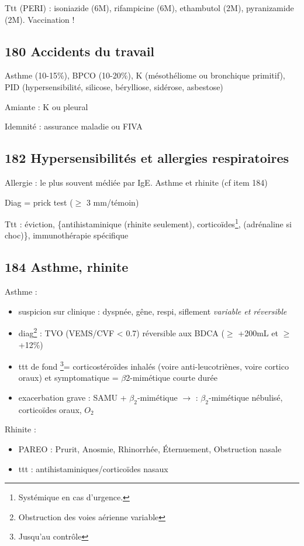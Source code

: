 \documentclass[11pt]{article}
\begin{document}
Ttt (PERI) : isoniazide (6M), rifampicine (6M), ethambutol (2M), pyranizamide (2M).
Vaccination !
\subsection{180 Accidents du travail}
\label{sec:org01ec130}
Asthme (10-15\%), BPCO (10-20\%), K (mésothéliome ou bronchique primitif), PID
(hypersensibilité, silicose, bérylliose, sidérose, asbestose)

Amiante : K ou pleural

Idemnité : assurance maladie ou FIVA
\subsection{182 Hypersensibilités et allergies respiratoires}
\label{sec:orge2a8bd6}
Allergie : le plus souvent médiée par IgE. Asthme et rhinite (cf item 184)

Diag = prick test (\diameter \(\ge\) 3 mm/témoin)

Ttt : éviction, \{antihistaminique (rhinite seulement), corticoïdes\footnote{Systémique en cas d'urgence.},
(adrénaline si choc)\}, immunothérapie spécifique
\subsection{184 Asthme, rhinite}
\label{sec:org900c215}
Asthme :
\begin{itemize}
\item suspicion sur clinique : dyspnée, gêne, respi, siflement \emph{variable et réversible}
\item diag\footnote{Obstruction des voies aérienne variable} : TVO (VEMS/CVF < 0.7) réversible aux BDCA (\(\ge\) +200mL et \(\ge\) +12\%)
\item ttt de fond \footnote{Jusqu'au contrôle}= corticostéroïdes inhalés (voire anti-leucotriènes, voire cortico
oraux) et symptomatique = \(\beta\)2-mimétique courte durée
\item \faBomb{} exacerbation grave : SAMU + \(\beta_{\text{2}}\)-mimétique \(\rightarrow\) \faHospitalO : \(\beta_{\text{2}}\)-mimétique nébulisé, corticoïdes
oraux, \(O_2\)
\end{itemize}
Rhinite : 
\begin{itemize}
\item PAREO : Prurit, Anosmie, Rhinorrhée, Éternuement, Obstruction nasale
\item ttt : antihistaminiques/corticoïdes nasaux
\end{itemize}
\end{document}
